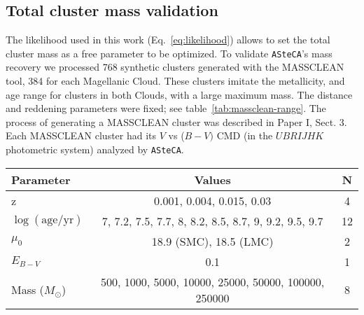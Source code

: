 \documentclass[referee]{aa}
\begin{document}
\begin{appendix}

\section{Total cluster mass validation}
\label{apdx:mass_valid}

The likelihood used in this work (Eq.~\ref{eq:likelihood}) allows
to set the total cluster mass as a free parameter to be optimized.
To validate \texttt{ASteCA}'s mass recovery we processed 768 synthetic
clusters generated with the MASSCLEAN tool, 384 for each Magellanic Cloud.
%
These clusters imitate the metallicity, and age range for clusters in
both Clouds, with a large maximum mass. The distance and reddening parameters
were fixed; see table~\ref{tab:massclean-range}.
The process of generating a MASSCLEAN cluster was described in
Paper I, Sect. 3. Each MASSCLEAN cluster had its $V$ vs ($B-V)$ CMD (in the
$UBRIJHK$ photometric system) analyzed by \texttt{ASteCA}.

\begin{table*}
\centering
\caption{Parameter values used to generate the set of 768 MASSCLEAN clusters.}
\label{tab:massclean-range}
\begin{tabular}{lcc}
\hline\hline
 Parameter & Values & N\\
\hline
z & 0.001, 0.004, 0.015, 0.03 & 4\\
$\log\mathrm{(age/yr)}$ & 7, 7.2, 7.5, 7.7, 8, 8.2, 8.5, 8.7, 9, 9.2, 9.5, 9.7 &
12\\
$\mu_0$ & 18.9 (SMC), 18.5 (LMC) & 2\\
$E_{B-V}$ & 0.1 & 1\\
Mass ($M_{\odot}$) & 500, 1000, 5000, 10000, 25000, 50000, 100000, 250000 & 8\\
\hline
\end{tabular}
\end{table*}


\end{appendix}
\end{document}
